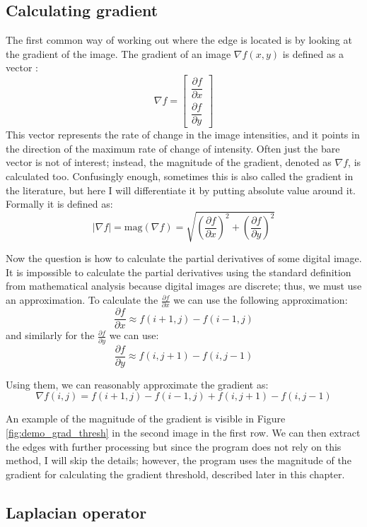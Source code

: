\documentclass[
  digital,     %
  oneside,     %
  nosansbold,  %
  nocolorbold, %
  lof,         %
  lot,         %
]{fithesis4}
\begin{document}
\subsection{Calculating gradient}

The first common way of working out where the edge is located is by looking at
the gradient of the image. The gradient of an image $\nabla f(x,y)$ is defined
as a vector \cite{gonzalez2002}:
$$\nabla f =
\begin{bmatrix}
    \dfrac{\partial f}{\partial x}\\[2ex]
    \dfrac{\partial f}{\partial y}
\end{bmatrix}$$
This vector represents the rate of change in the image intensities, and it points in
the direction of the maximum rate of change of intensity. Often just the bare
vector is not of interest; instead, the magnitude of the gradient, denoted as
$\nabla f$, is calculated too. Confusingly enough, sometimes this is also called
the gradient in the literature, but here I will differentiate it by putting
absolute value around it. Formally it is defined as:
$$|\nabla f| = \text{mag}(\nabla f) = \sqrt{(\frac{\partial f}{\partial x})^2 +
(\frac{\partial f}{\partial y})^2}$$

Now the question is how to calculate the partial derivatives of some digital image.
It is impossible to calculate the partial derivatives using the standard
definition from mathematical analysis because digital images are discrete; thus,
we must use an approximation. To calculate the $\frac{\partial f}{\partial x}$
we can use the following approximation:
$$\frac{\partial f}{\partial x} \approx f(i+1,j)-f(i-1,j)$$
and similarly for the $\frac{\partial f}{\partial y}$ we can use:
$$\frac{\partial f}{\partial y} \approx f(i, j+1)-f(i,j-1)$$

Using them, we can reasonably approximate the gradient as:
$$\nabla f(i, j) = f(i+1,j) - f(i-1,j) + f(i,j+1) - f(i,j-1)$$

An example of the magnitude of the gradient is visible in Figure
\ref{fig:demo_grad_thresh} in the second image in the first row.
We can then extract the edges with further processing but since the program
does not rely on this method, I will skip the details; however, the program uses
the magnitude of the gradient for calculating the gradient threshold, described later
in this chapter.

\subsection{Laplacian operator}
\end{document}
